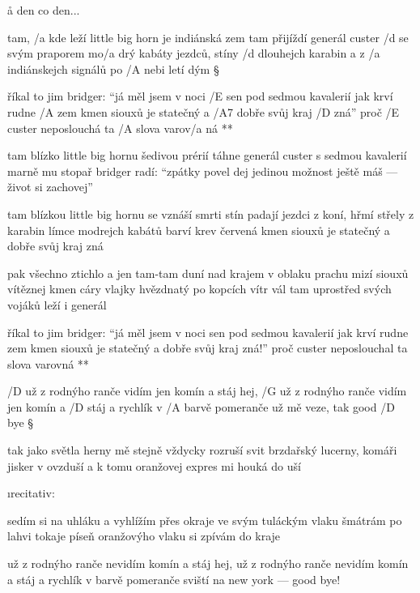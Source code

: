 \r a den co den...




tam, /a kde leží little big horn je indiánská zem
tam přijíždí generál custer /d se svým praporem
mo/a drý kabáty jezdců, stíny /d dlouhejch karabin
a z /a indiánskejch signálů po /A nebi letí dým \S

\R říkal to jim bridger: ``já měl jsem v noci /E sen
   pod sedmou kavalerií jak krví rudne /A zem
   kmen siouxů je statečný a /A7 dobře svůj kraj /D zná''
   proč /E custer neposlouchá ta /A slova varov/a ná **

tam blízko little big hornu šedivou prérií
táhne generál custer s sedmou kavalerií
marně mu stopař bridger radí: ``zpátky povel dej
jedinou možnost ještě máš --- život si zachovej'' \s

tam blízkou little big hornu se vznáší smrti stín
padají jezdci z koní, hřmí střely z karabin
límce modrejch kabátů barví krev červená
kmen siouxů je statečný a dobře svůj kraj zná \s

pak všechno ztichlo a jen tam-tam duní nad krajem
v oblaku prachu mizí siouxů vítěznej kmen
cáry vlajky hvězdnatý po kopcích vítr vál
tam uprostřed svých vojáků leží i generál \s

\R říkal to jim bridger: ``já měl jsem v noci sen
   pod sedmou kavalerií jak krví rudne zem
   kmen siouxů je statečný a dobře svůj kraj zná!''
   proč custer neposlouchal ta slova varovná **




/D už z rodnýho ranče vidím jen komín a stáj
hej, /G už z rodnýho ranče vidím jen komín a /D stáj
a rychlík v /A barvě pomeranče už mě veze, tak good /D bye \S


tak jako světla herny mě stejně vždycky rozruší
svit brzdařský lucerny, komáři jisker v ovzduší
a k tomu oranžovej expres mi houká do uší \s

{\i recitativ:} \s
{}\s

sedím si na uhláku a vyhlížím přes okraje
ve svým tuláckým vlaku šmátrám po lahvi tokaje
píseň oranžovýho vlaku si zpívám do kraje \s

už z rodnýho ranče nevidím komín a stáj
hej, už z rodnýho ranče nevidím komín a stáj
a rychlík v barvě pomeranče sviští na new york --- good bye!



